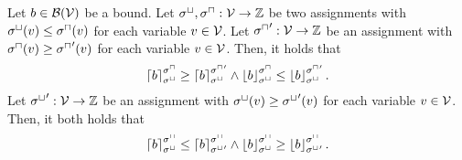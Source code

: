 \begin{theorem}
  Let $b \in \BoundSet(\VSet)$ be a bound.
  Let $\lstate, \ustate: \VSet \rightarrow \mathbb{Z}$ be two assignments with $\lstate(v) \leq \ustate(v)$ for each variable $v \in \VSet$.
  Let $\ustate': \VSet \rightarrow \mathbb{Z}$ be an assignment with $\ustate(v) \geq \ustate'(v)$ for each variable $v \in \VSet$.
  Then, it holds that
  \[ \ueval{b}{\lstate}{\ustate} \geq \ueval{b}{\lstate}{\ustate'} \wedge \leval{b}{\lstate}{\ustate} \leq \leval{b}{\lstate}{\ustate'}. \]
  Let $\lstate': \VSet \rightarrow \mathbb{Z}$ be an assignment with $\lstate(v) \geq \lstate'(v)$ for each variable $v \in \VSet$.
  Then, it both holds that
  \[ \ueval{b}{\lstate}{\ustate} \leq \ueval{b}{\lstate'}{\ustate} \wedge \leval{b}{\lstate}{\ustate} \geq \leval{b}{\lstate'}{\ustate}. \]
\end{theorem}
